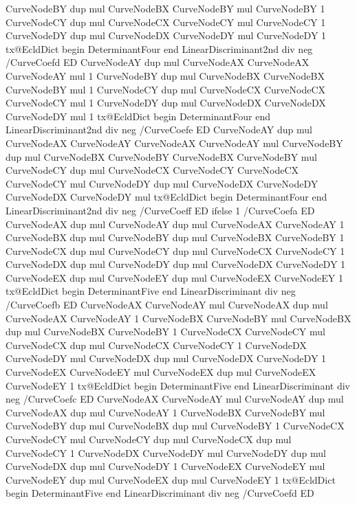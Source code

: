 {{{          CurveNodeBY dup mul CurveNodeBX CurveNodeBY mul CurveNodeBY 1
          CurveNodeCY dup mul CurveNodeCX CurveNodeCY mul CurveNodeCY 1
          CurveNodeDY dup mul CurveNodeDX CurveNodeDY mul CurveNodeDY 1
          tx@EcldDict begin DeterminantFour end LinearDiscriminant2nd div neg /CurveCoefd ED
          CurveNodeAY dup mul CurveNodeAX CurveNodeAX CurveNodeAY mul 1
          CurveNodeBY dup mul CurveNodeBX CurveNodeBX CurveNodeBY mul 1
          CurveNodeCY dup mul CurveNodeCX CurveNodeCX CurveNodeCY mul 1
          CurveNodeDY dup mul CurveNodeDX CurveNodeDX CurveNodeDY mul 1
          tx@EcldDict begin DeterminantFour end LinearDiscriminant2nd div neg /CurveCoefe ED
          CurveNodeAY dup mul CurveNodeAX CurveNodeAY CurveNodeAX CurveNodeAY mul
          CurveNodeBY dup mul CurveNodeBX CurveNodeBY CurveNodeBX CurveNodeBY mul
          CurveNodeCY dup mul CurveNodeCX CurveNodeCY CurveNodeCX CurveNodeCY mul
          CurveNodeDY dup mul CurveNodeDX CurveNodeDY CurveNodeDX CurveNodeDY mul
          tx@EcldDict begin DeterminantFour end LinearDiscriminant2nd div neg /CurveCoeff ED
        } ifelse
      } {
        1 /CurveCoefa ED
        CurveNodeAX dup mul CurveNodeAY dup mul CurveNodeAX CurveNodeAY 1
        CurveNodeBX dup mul CurveNodeBY dup mul CurveNodeBX CurveNodeBY 1
        CurveNodeCX dup mul CurveNodeCY dup mul CurveNodeCX CurveNodeCY 1
        CurveNodeDX dup mul CurveNodeDY dup mul CurveNodeDX CurveNodeDY 1
        CurveNodeEX dup mul CurveNodeEY dup mul CurveNodeEX CurveNodeEY 1
        tx@EcldDict begin DeterminantFive end LinearDiscriminant div neg /CurveCoefb ED
        CurveNodeAX CurveNodeAY mul CurveNodeAX dup mul CurveNodeAX CurveNodeAY 1
        CurveNodeBX CurveNodeBY mul CurveNodeBX dup mul CurveNodeBX CurveNodeBY 1
        CurveNodeCX CurveNodeCY mul CurveNodeCX dup mul CurveNodeCX CurveNodeCY 1
        CurveNodeDX CurveNodeDY mul CurveNodeDX dup mul CurveNodeDX CurveNodeDY 1
        CurveNodeEX CurveNodeEY mul CurveNodeEX dup mul CurveNodeEX CurveNodeEY 1
        tx@EcldDict begin DeterminantFive end LinearDiscriminant div neg /CurveCoefc ED
        CurveNodeAX CurveNodeAY mul CurveNodeAY dup mul CurveNodeAX dup mul CurveNodeAY 1
        CurveNodeBX CurveNodeBY mul CurveNodeBY dup mul CurveNodeBX dup mul CurveNodeBY 1
        CurveNodeCX CurveNodeCY mul CurveNodeCY dup mul CurveNodeCX dup mul CurveNodeCY 1
        CurveNodeDX CurveNodeDY mul CurveNodeDY dup mul CurveNodeDX dup mul CurveNodeDY 1
        CurveNodeEX CurveNodeEY mul CurveNodeEY dup mul CurveNodeEX dup mul CurveNodeEY 1
        tx@EcldDict begin DeterminantFive end LinearDiscriminant div neg /CurveCoefd ED
}}
